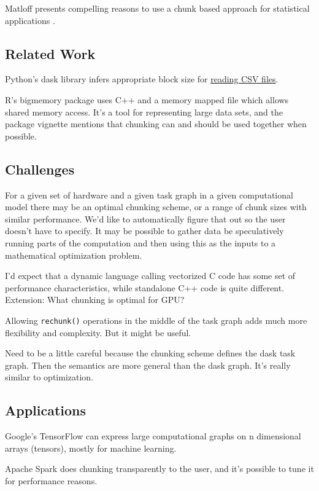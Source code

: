 \documentclass[12pt]{article}
\begin{document}
Matloff presents compelling reasons to use a chunk based
approach for statistical applications \cite{matloff2014software}.

\subsection{Related Work}

Python's dask library infers appropriate block size for
\href{https://github.com/dask/dask/pull/1328}{reading CSV files}.

R's bigmemory package uses C++ and a memory mapped file which allows shared
memory access. \cite{kane2010bigmemory} It's a tool for representing large
data sets, and the package vignette mentions that chunking can and should
be used together when possible.

\subsection{Challenges}

For a given set of hardware and a given task graph in a given
computational model there may be
an optimal chunking scheme, or a range of chunk sizes with similar performance.
We'd like to automatically figure that out so the user doesn't have to
specify. It may be possible to gather data be speculatively running parts
of the computation and then using this as the inputs to a 
mathematical optimization problem.

I'd expect that a dynamic language calling vectorized C code has some set
of performance characteristics, while standalone C++ code is quite
different.
Extension: What chunking is optimal for GPU?

Allowing \texttt{rechunk()} operations in the middle of the task graph adds
much more flexibility and complexity. But it might be useful.

Need to be a little careful because the chunking scheme defines the dask
task graph. Then the semantics are more general than the dask graph. It's
really similar to optimization.

\subsection{Applications}

Google's TensorFlow can express large computational graphs on n dimensional
arrays (tensors), mostly for machine learning.

Apache Spark does chunking transparently to the user, and it's possible to
tune it for performance reasons.
\end{document}
